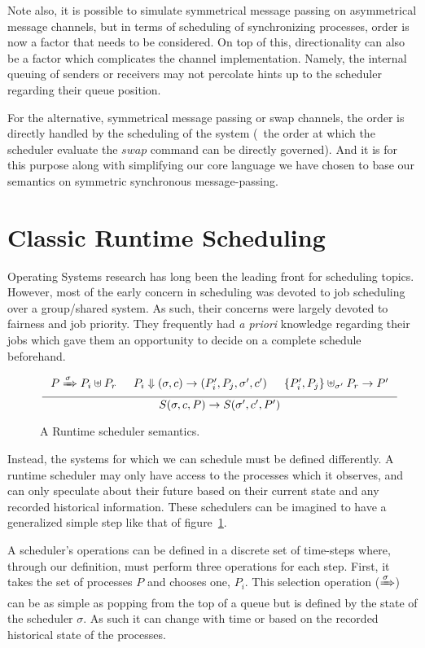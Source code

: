 Note also, it is possible to simulate symmetrical message passing on asymmetrical 
message channels, but in terms of scheduling of synchronizing processes, order 
is now a factor that needs to be considered. On top of this, directionality can 
also be a factor which complicates the channel implementation. Namely, the 
internal queuing of senders or receivers may not percolate hints up to the 
scheduler regarding their queue position. 

For the alternative, symmetrical message passing or swap channels, the order is 
directly handled by the scheduling of the system (\ie~the order at which the 
scheduler evaluate the $swap$ command can be directly governed). And it is for 
this purpose along with simplifying our core language we have chosen to base our
semantics on symmetric synchronous message-passing. 

\section{Classic Runtime Scheduling}

Operating Systems research has long been the leading front for scheduling topics. 
However, most of the early concern in scheduling was devoted to job scheduling 
over a group/shared system. As such, their concerns were largely devoted to 
fairness and job priority. They frequently had {\sl a priori} knowledge regarding
their jobs which gave them an opportunity to decide on a complete schedule 
beforehand.

\begin{figure}
    \[
        \inference{ P \xRightarrow{\sigma} P_i \uplus P_r &
                    P_i \Downarrow (\sigma, c) \rightarrow (P_i',P_j,\sigma',c') &
                    \{P_i',P_j\} \uplus_{\sigma'} P_r \rightarrow P'
                  }
                  { S(\sigma, c, P ) \rightarrow S(\sigma',c', P') }
    \]
    \caption{A Runtime scheduler semantics.}
    \label{fig:scheduler-step}
\end{figure}

Instead, the systems for which we can schedule must be defined differently.
A runtime scheduler may only have access to the processes which it observes, 
and can only speculate about their future based on their current state and any
recorded historical information. These schedulers can be imagined to have a 
generalized simple step like that of figure~\ref{fig:scheduler-step}. 

A scheduler's operations can be defined in a discrete set of time-steps where,
through our definition, must perform three operations for each step. First, it takes 
the set of processes $P$ and chooses one, $P_i$. This selection operation 
($\xRightarrow{\sigma}$) can be as simple as popping from the top of a queue but
is defined by the state of the scheduler $\sigma$. As such it can change with 
time or based on the recorded historical state of the processes. 
 
